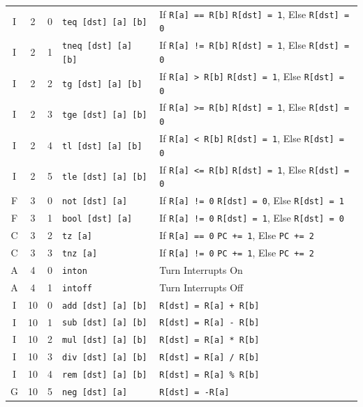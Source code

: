 \documentclass{article}
\begin{document}
\begin{table}[h!]
\begin{footnotesize}
\begin{tabular}{c|cc|l|l}
			I & 2 & 0 & \texttt{teq [dst] [a] [b]} & If \texttt{R[a] == R[b]} \texttt{R[dst] = 1}, Else \texttt{R[dst] = 0} \\
			I & 2 & 1 & \texttt{tneq [dst] [a] [b]} & If \texttt{R[a] != R[b]} \texttt{R[dst] = 1}, Else \texttt{R[dst] = 0} \\
			I & 2 & 2 & \texttt{tg [dst] [a] [b]} & If \texttt{R[a] > R[b]} \texttt{R[dst] = 1}, Else \texttt{R[dst] = 0} \\
			I & 2 & 3 & \texttt{tge [dst] [a] [b]} & If \texttt{R[a] >= R[b]} \texttt{R[dst] = 1}, Else \texttt{R[dst] = 0} \\
			I & 2 & 4 & \texttt{tl [dst] [a] [b]} & If \texttt{R[a] < R[b]} \texttt{R[dst] = 1}, Else \texttt{R[dst] = 0} \\
			I & 2 & 5 & \texttt{tle [dst] [a] [b]} & If \texttt{R[a] <= R[b]} \texttt{R[dst] = 1}, Else \texttt{R[dst] = 0} \\

			F & 3 & 0 & \texttt{not [dst] [a]} & If \texttt{R[a] != 0} \texttt{R[dst] = 0}, Else \texttt{R[dst] = 1} \\
			F & 3 & 1 & \texttt{bool [dst] [a]} & If \texttt{R[a] != 0} \texttt{R[dst] = 1}, Else \texttt{R[dst] = 0} \\
			C & 3 & 2 & \texttt{tz [a]} & If \texttt{R[a] == 0} \texttt{PC += 1}, Else \texttt{PC += 2} \\
			C & 3 & 3 & \texttt{tnz [a]} & If \texttt{R[a] != 0} \texttt{PC += 1}, Else \texttt{PC += 2} \\

			A & 4 & 0 & \texttt{inton} & Turn Interrupts On \\
			A & 4 & 1 & \texttt{intoff} & Turn Interrupts Off \\

			I & 10 & 0 & \texttt{add [dst] [a] [b]} & \texttt{R[dst] = R[a] + R[b]} \\
			I & 10 & 1 & \texttt{sub [dst] [a] [b]} & \texttt{R[dst] = R[a] - R[b]} \\
			I & 10 & 2 & \texttt{mul [dst] [a] [b]} & \texttt{R[dst] = R[a] * R[b]} \\
			I & 10 & 3 & \texttt{div [dst] [a] [b]} & \texttt{R[dst] = R[a] / R[b]} \\
			I & 10 & 4 & \texttt{rem [dst] [a] [b]} & \texttt{R[dst] = R[a] \% R[b]} \\
			G & 10 & 5 & \texttt{neg [dst] [a]} & \texttt{R[dst] = -R[a]} \\


\end{tabular}
\end{footnotesize}
\end{table}
\end{document}
